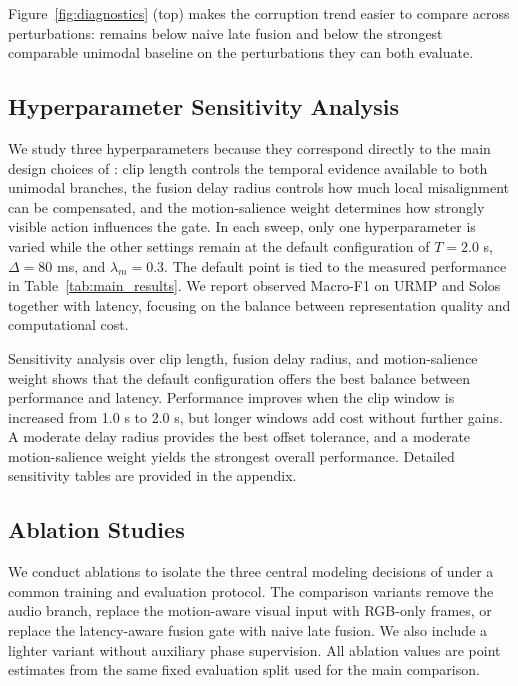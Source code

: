 Figure~\ref{fig:diagnostics} (top) makes the corruption trend easier to compare across perturbations: \method{} remains below naive late fusion and below the strongest comparable unimodal baseline on the perturbations they can both evaluate.

\subsection{Hyperparameter Sensitivity Analysis}

We study three hyperparameters because they correspond directly to the main design choices of \method: clip length controls the temporal evidence available to both unimodal branches, the fusion delay radius controls how much local misalignment can be compensated, and the motion-salience weight determines how strongly visible action influences the gate. In each sweep, only one hyperparameter is varied while the other settings remain at the default configuration of $T=2.0$ s, $\Delta=80$ ms, and $\lambda_m=0.3$. The default point is tied to the measured performance in Table~\ref{tab:main_results}. We report observed Macro-F1 on URMP and Solos together with latency, focusing on the balance between representation quality and computational cost.

Sensitivity analysis over clip length, fusion delay radius, and motion-salience weight shows that the default configuration offers the best balance between performance and latency. Performance improves when the clip window is increased from 1.0 s to 2.0 s, but longer windows add cost without further gains. A moderate delay radius provides the best offset tolerance, and a moderate motion-salience weight yields the strongest overall performance. Detailed sensitivity tables are provided in the appendix.

\subsection{Ablation Studies}

We conduct ablations to isolate the three central modeling decisions of \method{} under a common training and evaluation protocol. The comparison variants remove the audio branch, replace the motion-aware visual input with RGB-only frames, or replace the latency-aware fusion gate with naive late fusion. We also include a lighter variant without auxiliary phase supervision. All ablation values are point estimates from the same fixed evaluation split used for the main comparison.

